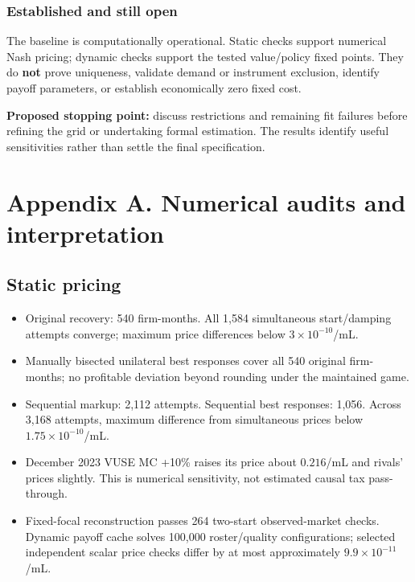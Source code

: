 \documentclass[11pt,]{article}
\providecommand{\tightlist}{%
  \setlength{\itemsep}{0pt}\setlength{\parskip}{0pt}}
\begin{document}
\subsubsection{Established and still
open}\label{established-and-still-open}

The baseline is computationally operational. Static checks support
numerical Nash pricing; dynamic checks support the tested value/policy
fixed points. They do \textbf{not} prove uniqueness, validate demand or
instrument exclusion, identify payoff parameters, or establish
economically zero fixed cost.

\textbf{Proposed stopping point:} discuss restrictions and remaining fit
failures before refining the grid or undertaking formal estimation. The
results identify useful sensitivities rather than settle the final
specification.

\clearpage
\setcounter{page}{1} \renewcommand{\thepage}{A-\arabic{page}}

\section{Appendix A. Numerical audits and
interpretation}\label{appendix-a.-numerical-audits-and-interpretation}

\subsection{Static pricing}\label{static-pricing}

\begin{itemize}
\tightlist
\item
  Original recovery: 540 firm-months. All 1,584 simultaneous
  start/damping attempts converge; maximum price differences below
  \(3\times10^{-10}\)/mL.
\item
  Manually bisected unilateral best responses cover all 540 original
  firm-months; no profitable deviation beyond rounding under the
  maintained game.
\item
  Sequential markup: 2,112 attempts. Sequential best responses: 1,056.
  Across 3,168 attempts, maximum difference from simultaneous prices
  below \(1.75\times10^{-10}\)/mL.
\item
  December 2023 VUSE MC +10\% raises its price about \(0.216\)/mL and
  rivals' prices slightly. This is numerical sensitivity, not estimated
  causal tax pass-through.
\item
  Fixed-focal reconstruction passes 264 two-start observed-market
  checks. Dynamic payoff cache solves 100,000 roster/quality
  configurations; selected independent scalar price checks differ by at
  most approximately \(9.9\times10^{-11}\)/mL.
\end{itemize}
\end{document}
